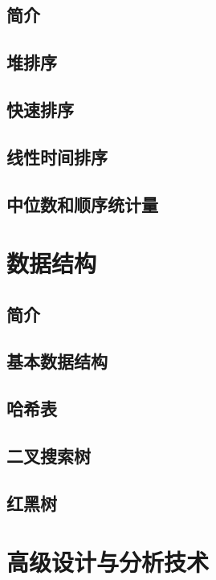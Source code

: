 \documentclass[lang=cn,newtx,10pt,scheme=chinese]{elegantbook}
\begin{document}
\chapter*{简介}

\chapter{堆排序}

\chapter{快速排序}

\chapter{线性时间排序}

\chapter{中位数和顺序统计量}

\part{数据结构}

\chapter*{简介}

\chapter{基本数据结构}

\chapter{哈希表}

\chapter{二叉搜索树}

\chapter{红黑树}

\part{高级设计与分析技术}
\end{document}
